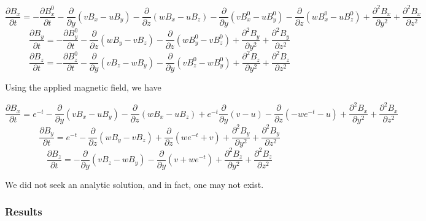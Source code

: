 \documentclass[11pt]{article}
\newcommand{\figS}{22.1em}
\newcommand{\figH}{\figS}
\newcommand{\figW}{\figS}
\begin{document}
\begin{equation}
	\frac{\partial B_x}{\partial t} 
	=
	- \frac{\partial B_x^0}{\partial t} 
	- \frac{\partial}{\partial y} (v B_x - u B_y)
	- \frac{\partial}{\partial z} (w B_x - u B_z)
	- \frac{\partial}{\partial y} (v B_x^0 - u B_y^0)
	- \frac{\partial}{\partial z} (w B_x^0 - u B_z^0)	
	+ \frac{\partial^2 B_x}{\partial y^2}
	+ \frac{\partial^2 B_x}{\partial z^2}
\end{equation}
\begin{equation}
	\frac{\partial B_y}{\partial t} 
	=
	- \frac{\partial B_y^0}{\partial t} 
	- \frac{\partial}{\partial z} (w B_y - v B_z)
	- \frac{\partial}{\partial z} (w B_y^0 - v B_z^0)	
	+ \frac{\partial^2 B_y}{\partial y^2}
	+ \frac{\partial^2 B_y}{\partial z^2}
\end{equation}
\begin{equation}
	\frac{\partial B_z}{\partial t} 
	=
	- \frac{\partial B_z^0}{\partial t} 
	- \frac{\partial}{\partial y} (v B_z - w B_y)
	- \frac{\partial}{\partial y} (v B_z^0 - w B_y^0)
	+ \frac{\partial^2 B_z}{\partial y^2}
	+ \frac{\partial^2 B_z}{\partial z^2}
\end{equation}

Using the applied magnetic field, we have

\begin{equation}
	\frac{\partial B_x}{\partial t} 
	=
	e^{-t}
	- \frac{\partial}{\partial y} (v B_x - u B_y)
	- \frac{\partial}{\partial z} (w B_x - u B_z)
	+ e^{-t} \frac{\partial}{\partial y} (v - u)
	- \frac{\partial}{\partial z} (-w e^{-t} - u)	
	+ \frac{\partial^2 B_x}{\partial y^2}
	+ \frac{\partial^2 B_x}{\partial z^2}
\end{equation}
\begin{equation}
	\frac{\partial B_y}{\partial t} 
	=
	e^{-t}
	- \frac{\partial}{\partial z} (w B_y - v B_z)
	+ \frac{\partial}{\partial z} (w e^{-t} + v)	
	+ \frac{\partial^2 B_y}{\partial y^2}
	+ \frac{\partial^2 B_y}{\partial z^2}
\end{equation}
\begin{equation}
	\frac{\partial B_z}{\partial t} 
	=
	- \frac{\partial}{\partial y} (v B_z - w B_y)
	- \frac{\partial}{\partial y} (v + w e^{-t})
	+ \frac{\partial^2 B_z}{\partial y^2}
	+ \frac{\partial^2 B_z}{\partial z^2}
\end{equation}

We did not seek an analytic solution, and in fact, one may not exist.


\subsubsection{Results}

\begin{figure}[H]
 \centering
   \caption[Optional ]{}
\end{figure}




\end{document}
